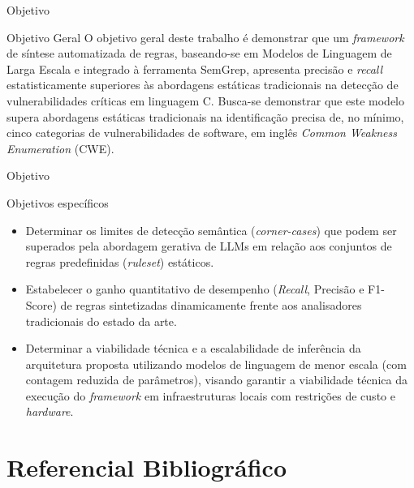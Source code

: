 \documentclass[
    aspectratio=169,   %
    12pt,
    brazil
]{beamer}
\newcommand{\minhaspaginas}{}
\begin{document}
\renewcommand{\minhaspaginas}{\small 13}
\begin{frame}{Objetivo}
  \begin{block}{Objetivo Geral}
    O objetivo geral deste trabalho é demonstrar que um \textit{framework} de síntese automatizada de regras, baseando-se em Modelos de Linguagem de Larga Escala e integrado à ferramenta SemGrep, apresenta precisão e \textit{recall} estatisticamente superiores às abordagens estáticas tradicionais na detecção de vulnerabilidades críticas em linguagem C.
    Busca-se demonstrar que este modelo supera abordagens estáticas tradicionais na identificação precisa de, no mínimo, cinco categorias de vulnerabilidades de software, em inglês \textit{Common Weakness Enumeration} (CWE).
  \end{block}
\end{frame}

\renewcommand{\minhaspaginas}{\small 13 - 14}
\begin{frame}{Objetivo}
  \begin{block}{Objetivos específicos}
    \begin{itemize}
      \item Determinar os limites de detecção semântica (\textit{corner-cases}) que podem ser superados pela abordagem gerativa de LLMs em relação aos conjuntos de regras predefinidas (\textit{ruleset}) estáticos.
      \item Estabelecer o ganho quantitativo de desempenho (\textit{Recall}, Precisão e F1-Score) de regras sintetizadas dinamicamente frente aos analisadores tradicionais do estado da arte.
      \item Determinar a viabilidade técnica e a escalabilidade de inferência da arquitetura proposta utilizando modelos de linguagem de menor escala (com contagem reduzida de parâmetros), visando garantir a viabilidade técnica da execução do \textit{framework} em infraestruturas locais com restrições de custo e \textit{hardware}.
    \end{itemize}
  \end{block}
\end{frame}

\section{Referencial Bibliográfico}
\end{document}
